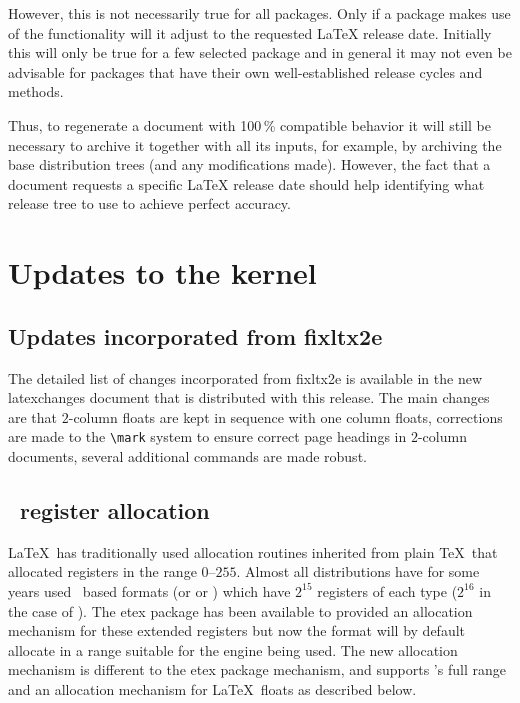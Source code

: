 \documentclass{ltnews}
\begin{document}
However, this is not necessarily true for all packages.
 Only if a package makes use of the 
functionality will it adjust to the
requested \LaTeX{} release date. Initially this will only be true for
a few selected package and in general it may not even be advisable for packages
that have their own well-established release cycles and methods.

Thus, to regenerate a document with 100\,\% compatible behavior
it will still be necessary
to archive it together with all its inputs, for example, by archiving
the base distribution trees (and any modifications made). However, the
fact that a document requests a specific \LaTeX{} release date should
help identifying what release tree to use to achieve perfect accuracy.


\section{Updates to the kernel}

\subsection{Updates incorporated from \textsf{fixltx2e}}

The detailed list of changes incorporated from \textsf{fixltx2e} is
available in the new \textsf{latexchanges} document that is
distributed with this release. The main changes are that $2$-column
floats are kept in sequence with one column floats, corrections are
made to the \verb|\mark| system to ensure correct page headings in
$2$-column documents, several additional commands are made robust.

\subsection{\eTeX\ register allocation}

\LaTeX\ has traditionally used allocation routines inherited from plain \TeX\
that allocated registers in the range $0$--$255$. Almost all distributions have
for some years used \eTeX\ based formats (or \hologo{XeTeX} or )
which have $2^{15}$ registers of each type ($2^{16}$ in the case of
\hologo{LuaTeX}). The \textsf{etex} package has been available to provided an
allocation mechanism for these extended registers but now the format will by
default allocate in a range suitable for the engine being used. The new
allocation mechanism is different to the \textsf{etex} package mechanism, and
supports \hologo{LuaTeX}'s full range and an allocation mechanism for \LaTeX\
floats as described below.
\end{document}
